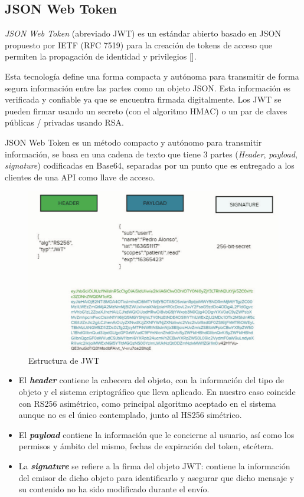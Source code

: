 \subsection{JSON Web Token}
\textit{JSON Web Token }(abreviado JWT) es un estándar abierto basado en JSON propuesto por IETF (RFC 7519) para la creación de tokens de acceso que permiten la propagación de identidad y privilegios [\cite{bradley_sakimura_jones_2015}].

Esta tecnología define una forma compacta y autónoma para transmitir de forma segura información entre las partes como un objeto JSON. Esta información es verificada y confiable ya que se encuentra firmada digitalmente. Los JWT se pueden firmar usando un secreto (con el algoritmo HMAC) o un par de claves públicas / privadas usando RSA.

JSON Web Token es un método compacto y autónomo para transmitir información, se basa en una cadena de texto que tiene 3 partes (\textit{Header}, \textit{payload}, \textit{signature}) codificadas en Base64, separadas por un punto que es entregado a los clientes de una API como llave de acceso.

\begin{figure}[H]
	\centering
	\includegraphics[width=0.9\linewidth]{"Graphics/estructura de un objeto JWS"}
	\caption{Estructura de JWT}
	\label{fig:estructura-de-un-objeto-jws}
\end{figure}

\begin{itemize}
	\item El \textit{\textbf{header}} contiene la cabecera del objeto, con la información del tipo de objeto y el sistema criptográfico que lleva aplicado. En nuestro caso coincide con RS256 asimétrico, como principal algoritmo aceptado en el sistema aunque no es el único contemplado, junto al HS256 simétrico. 
	\item El \textit{\textbf{payload}} contiene la información que le concierne al usuario, así como los permisos y ámbito del mismo, fechas de expiración del token, etcétera. 
	\item La \textit{\textbf{signature}} se refiere a la firma del objeto JWT: contiene la información del emisor de dicho objeto para identificarlo y asegurar que dicho mensaje y su contenido no ha sido modificado durante el envío. 
\end{itemize}

